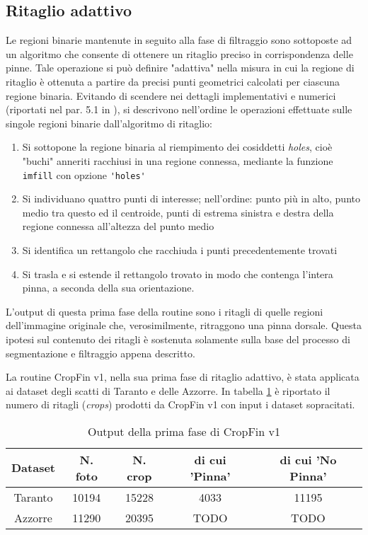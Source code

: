 \subsection*{Ritaglio adattivo}
Le regioni binarie mantenute in seguito alla fase di filtraggio sono sottoposte ad un algoritmo che consente di ottenere un ritaglio preciso in corrispondenza delle pinne.
Tale operazione si può definire "adattiva" nella misura in cui la regione di ritaglio è ottenuta a partire da precisi punti geometrici calcolati per ciascuna regione binaria.
Evitando di scendere nei dettagli implementativi e numerici (riportati nel par. 5.1 in \cite{gianvito}), si descrivono nell'ordine le operazioni effettuate sulle singole regioni binarie dall'algoritmo di ritaglio:
\begin{enumerate}
\item Si sottopone la regione binaria al riempimento dei cosiddetti \textit{holes}, cioè "buchi" anneriti racchiusi in una regione connessa, mediante la funzione \verb|imfill| con opzione \verb|'holes'|
\item Si individuano quattro punti di interesse; nell’ordine: punto più in alto, punto medio tra questo ed il centroide, punti di estrema sinistra e destra della regione connessa all’altezza del
punto medio
\item Si identifica un rettangolo che racchiuda i punti precedentemente trovati
\item Si trasla e si estende il rettangolo trovato in modo che contenga l’intera pinna, a seconda della sua orientazione.
\end{enumerate}

L'output di questa prima fase della routine sono i ritagli di quelle regioni dell'immagine originale che, verosimilmente, ritraggono una pinna dorsale. Questa ipotesi sul contenuto dei ritagli è sostenuta solamente sulla base del processo di segmentazione e filtraggio appena descritto.

La routine CropFin v1, nella sua prima fase di ritaglio adattivo, è stata applicata ai dataset degli scatti di Taranto e delle Azzorre. In tabella \ref{risultatiCrop} è riportato il numero di ritagli (\textit{crops}) prodotti da CropFin v1 con input i dataset sopracitati.

\begin{table}[h]

  \centering
  \begin{tabular}{c c c c c}
  \hline
  Dataset&N. foto&N. crop&di cui 'Pinna'&di cui 'No Pinna'\\
  \hline
  Taranto&10194&15228&4033&11195\\
  Azzorre&11290&20395& TODO & TODO \\
  \hline
  \end{tabular}
  
  \caption{Output della prima fase di CropFin v1}
  \label{risultatiCrop}

\end{table}

